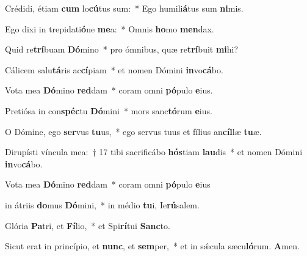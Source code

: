 \item Crédidi, étiam \textbf{cum} lo\textbf{cú}tus sum:~* Ego humili\textbf{á}tus sum \textbf{ni}mis.

\item Ego dixi in trepidati\textbf{ó}ne \textbf{me}a:~* Omnis \textbf{ho}mo \textbf{men}dax.

\item Quid re\textbf{trí}buam \textbf{Dó}mino~* pro ómnibus, quæ re\textbf{trí}buit \textbf{mi}hi?

\item Cálicem salu\textbf{tá}ris ac\textbf{cí}piam~* et nomen Dómini \textbf{in}vo\textbf{cá}bo.

\item Vota mea \textbf{Dó}mino \textbf{red}dam~* coram omni \textbf{pó}pulo \textbf{e}ius.

\item Pretiósa in con\textbf{spéc}tu \textbf{Dó}mini~* mors sanc\textbf{tó}rum \textbf{e}ius.

\item O Dómine, ego \textbf{ser}vus \textbf{tu}us,~* ego servus tuus et fílius an\textbf{cíl}læ \textbf{tu}æ.

\item Dirupísti víncula mea:~† 17 tibi sacrificábo \textbf{hós}tiam \textbf{lau}dis~* et nomen Dómini \textbf{in}vo\textbf{cá}bo.

\item Vota mea \textbf{Dó}mino \textbf{red}dam~* coram omni \textbf{pó}pulo \textbf{e}ius

\item in átriis \textbf{do}mus \textbf{Dó}mini,~* in médio \textbf{tu}i, Ie\textbf{rú}salem.

\item Glória \textbf{Pa}tri, et \textbf{Fí}lio,~* et Spi\textbf{rí}tui \textbf{Sanc}to.

\item Sicut erat in princípio, et \textbf{nunc}, et \textbf{sem}per,~* et in sǽcula sæcu\textbf{ló}rum. \textbf{A}men.